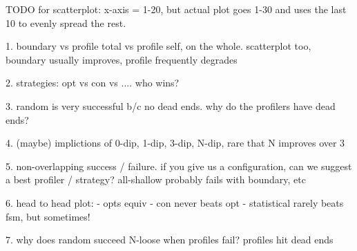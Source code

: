 
TODO for scatterplot: x-axis = 1-20, but actual plot goes 1-30 and uses the
last 10 to evenly spread the rest.

1. boundary vs profile total vs profile self, on the whole. scatterplot too,
   boundary usually improves, profile frequently degrades

2. strategies: opt vs con vs .... who wins?

3. random is very successful b/c no dead ends.
   why do the profilers have dead ends?

4. (maybe) implictions of 0-dip, 1-dip, 3-dip, N-dip,
   rare that N improves over 3

5. non-overlapping success / failure.
   if you give us a configuration, can we suggest a best profiler / strategy?
   all-shallow probably fails with boundary, etc

6. head to head plot:
   - opts equiv
   - con never beats opt
   - statistical rarely beats fsm, but sometimes!

7. why does random succeed N-loose when profiles fail? profiles hit dead ends



